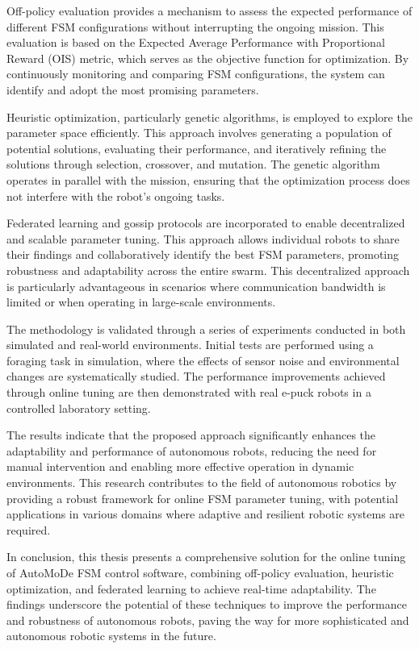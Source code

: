 \documentclass{ULBreport}
\begin{document}
Off-policy evaluation provides a mechanism to assess the expected performance of different FSM configurations without interrupting the ongoing mission. This evaluation is based on the Expected Average Performance with Proportional Reward (OIS) metric, which serves as the objective function for optimization. By continuously monitoring and comparing FSM configurations, the system can identify and adopt the most promising parameters.

Heuristic optimization, particularly genetic algorithms, is employed to explore the parameter space efficiently. This approach involves generating a population of potential solutions, evaluating their performance, and iteratively refining the solutions through selection, crossover, and mutation. The genetic algorithm operates in parallel with the mission, ensuring that the optimization process does not interfere with the robot's ongoing tasks.

Federated learning and gossip protocols are incorporated to enable decentralized and scalable parameter tuning. This approach allows individual robots to share their findings and collaboratively identify the best FSM parameters, promoting robustness and adaptability across the entire swarm. This decentralized approach is particularly advantageous in scenarios where communication bandwidth is limited or when operating in large-scale environments.

The methodology is validated through a series of experiments conducted in both simulated and real-world environments. Initial tests are performed using a foraging task in simulation, where the effects of sensor noise and environmental changes are systematically studied. The performance improvements achieved through online tuning are then demonstrated with real e-puck robots in a controlled laboratory setting.

The results indicate that the proposed approach significantly enhances the adaptability and performance of autonomous robots, reducing the need for manual intervention and enabling more effective operation in dynamic environments. This research contributes to the field of autonomous robotics by providing a robust framework for online FSM parameter tuning, with potential applications in various domains where adaptive and resilient robotic systems are required.

In conclusion, this thesis presents a comprehensive solution for the online tuning of AutoMoDe FSM control software, combining off-policy evaluation, heuristic optimization, and federated learning to achieve real-time adaptability. The findings underscore the potential of these techniques to improve the performance and robustness of autonomous robots, paving the way for more sophisticated and autonomous robotic systems in the future.
\end{document}
